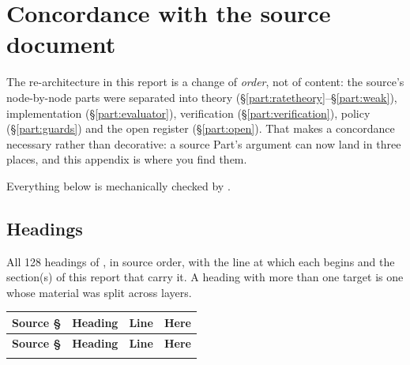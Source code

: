 %
%

\section{Concordance with the source document}
\label{app:concordance}

The re-architecture in this report is a change of \emph{order}, not of content:
the source's node-by-node parts were separated into theory
(\S\ref{part:ratetheory}--\S\ref{part:weak}), implementation
(\S\ref{part:evaluator}), verification (\S\ref{part:verification}), policy
(\S\ref{part:guards}) and the open register (\S\ref{part:open}). That makes a
concordance necessary rather than decorative: a source Part's argument can now
land in three places, and this appendix is where you find them.

Everything below is mechanically checked by
.

\subsection{Headings}
\label{app:headings}

All 128 headings of , in source order, with the line at
which each begins and the section(s) of this report that carry it. A heading
with more than one target is one whose material was split across layers.

\begingroup
\small
\begin{longtable}{@{}L{1.7cm} L{6.0cm} r L{4.6cm}@{}}
\toprule
\textbf{Source \S} & \textbf{Heading} & \textbf{Line} & \textbf{Here} \\
\midrule
\endfirsthead
\toprule
\textbf{Source \S} & \textbf{Heading} & \textbf{Line} & \textbf{Here} \\
\midrule
\endhead
\bottomrule
\endfoot

\end{longtable}
\endgroup

